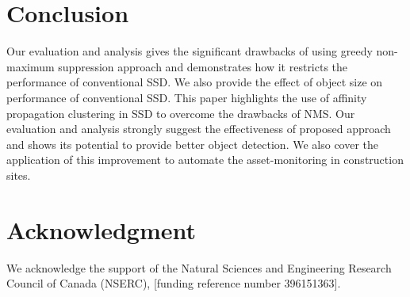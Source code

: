 \documentclass[conference]{IEEEtran}
\begin{document}
\section{Conclusion}
Our evaluation and analysis gives the significant drawbacks of using greedy non-maximum suppression approach and demonstrates how it restricts the performance of conventional SSD. We also provide the effect of object size on performance of conventional SSD. This paper highlights the use of affinity propagation clustering in SSD to overcome the drawbacks of NMS. Our evaluation and analysis strongly suggest the effectiveness of proposed approach and shows its potential to provide better object detection. We also cover the application of this improvement to automate the asset-monitoring in construction sites.
\section*{Acknowledgment}

We acknowledge the support of the Natural Sciences and Engineering Research Council of Canada (NSERC), [funding reference number 396151363].
%


\end{document}
